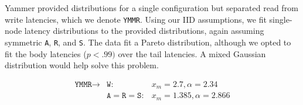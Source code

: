 \documentclass{vldb}
\begin{document}
Yammer provided distributions for a single configuration but separated
read from write latencies, which we denote \texttt{YMMR}.  Using our
IID assumptions, we fit single-node latency distributions to the
provided distributions, again assuming symmetric \texttt{A},
\texttt{R}, and \texttt{S}.  The data fit a Pareto distribution,
although we opted to fit the body latencies ($p<.99)$ over the tail
latencies.  A mixed Gaussian distribution would help solve this
problem.\vspace{-2mm}

\begin{equation*}
 \begin{array}{rll}
   \texttt{YMMR} \rightarrow  & \texttt{W}: & x_m = 2.7, \alpha=2.34\\
     & \texttt{A}= \texttt{R} = \texttt{S}: & x_m=1.385, \alpha=2.866\\
    \end{array}
\end{equation*}
\end{document}
